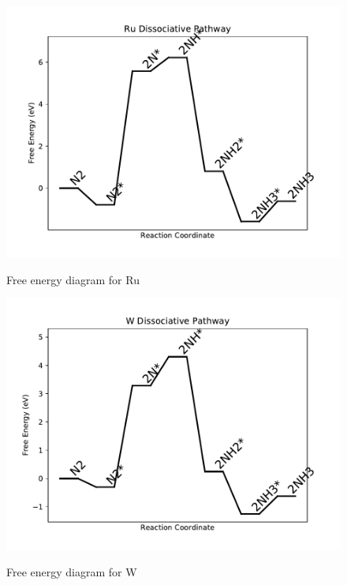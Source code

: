 \documentclass{article}
\begin{document}
\newpage
\begin{figure}
\includegraphics[width=1\linewidth]{data/plots/Ru_dissociative.pdf}
\label{fig:Ru_dissociative}
\caption{Free energy diagram for Ru}
\end{figure}

\begin{figure}
\includegraphics[width=1\linewidth]{data/plots/W_dissociative.pdf}
\label{fig:W_dissociative}
\caption{Free energy diagram for W}
\end{figure}
\end{document}
